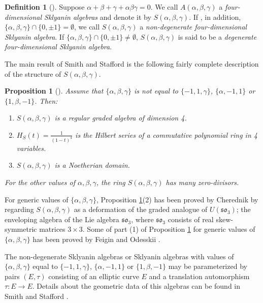 \documentclass{amsart}
\newtheorem{proposition}[theorem]{Proposition}
\theoremstyle{definition}
\newtheorem{definition}[theorem]{Definition}
\theoremstyle{remark}
\numberwithin{equation}{section}
\begin{document}
\begin{definition}[{\cite[p. 747]{ChirvasituSmith2023}}] 
Suppose $\alpha+\beta+\gamma+\alpha\beta\gamma=0$. We call $A(\alpha,\beta,\gamma)$ a {\em four-dimensional Sklyanin algebras} and denote it by $S(\alpha,\beta,\gamma)$. If , in addition, $\{\alpha,\beta,\gamma \} \cap \{0, \pm 1 \}=\emptyset $, we call $S(\alpha, \beta, \gamma)$ a \textit{non-degenerate four-dimensional Sklyanin algebra}. If $\{\alpha,\beta,\gamma \} \cap \{0, \pm 1 \}\neq \emptyset $, $S(\alpha, \beta, \gamma)$ is said to be a {\em degenerate four-dimensional Sklyanin algebra}. 
\end{definition}

The main result of Smith and Stafford \cite{SmithStafford1992} is the following fairly complete description of the structure of $S(\alpha,\beta,\gamma)$.

\begin{proposition}[{\cite[Theorem 0.3]{SmithStafford1992}}] \label{SmithStafford1992Theorem0.3}
Assume that $\{\alpha, \beta,\gamma\}$ is not equal to $\{-1,1,\gamma \}$, $\{\alpha,-1,1 \}$ or $\{1,\beta, -1 \}$. Then:
\begin{enumerate}
   \item [{\rm (1)}] $S(\alpha,\beta,\gamma)$ is a regular graded algebra of dimension 4.
    \item [{\rm (2)}] $H_S(t)=\frac{1}{(1-t)^4}$ is the Hilbert series of a commutative polynomial ring in 4 variables.
   \item [{\rm (3)}]   $S(\alpha,\beta,\gamma)$ is a Noetherian domain.
\end{enumerate}
For the other values of $\alpha,\beta, \gamma$, the ring $S(\alpha,\beta,\gamma)$ has many zero-divisors. 
\end{proposition}

For generic values of $\{\alpha,\beta, \gamma\}$, Proposition \ref{SmithStafford1992Theorem0.3}(2) has been proved by Cherednik \cite[Theorem 14]{Cherednik1986} by regarding $S(\alpha,\beta, \gamma)$ as a deformation of the graded analogue of $U(\mathfrak{so}_3)$; the enveloping algebra of the Lie algebra $\mathfrak{so}_3$, where  $\mathfrak{so}_3$ consists of real skew-symmetric matrices $3\times 3$. Some of part (1) of Proposition \ref{SmithStafford1992Theorem0.3} for generic values of $\{\alpha,\beta, \gamma\}$ has been proved by Feigin and Odesskii \cite{FeiginOdesskii1989, FeiginOdesskii1989(2)}. 

The non-degenerate Sklyanin algebras or Sklyanin algebras with values of  $\{\alpha, \beta,\gamma\}$ equal to $\{-1,1,\gamma \}$, $\{\alpha,-1,1 \}$ or $\{1,\beta, -1 \}$ may be parameterized by pairs $(E,\tau)$ consisting of an elliptic curve $E$ and a translation automorphism $\tau: E\to E$. Details about the geometric data of this algebras can be found in Smith and Stafford \cite{SmithStafford1992}.
\end{document}
